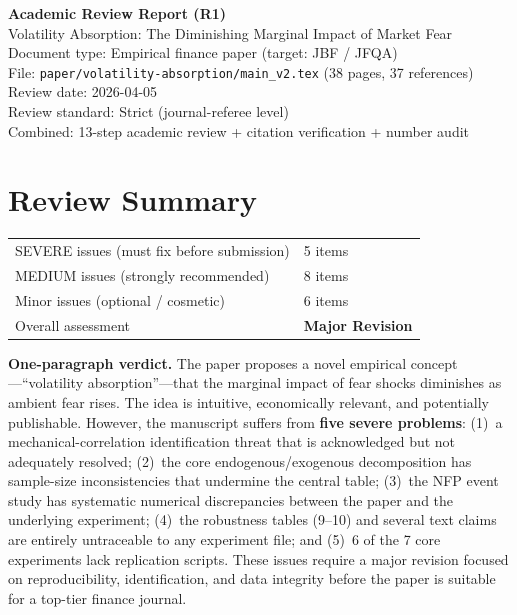 \documentclass[12pt,a4paper]{article}
\begin{document}
\begin{center}
{\Large\bfseries Academic Review Report (R1)}\\[0.5em]
{\large Volatility Absorption: The Diminishing Marginal Impact of Market Fear}\\[0.5em]
{\normalsize Document type: Empirical finance paper (target: JBF / JFQA)}\\
{\normalsize File: \texttt{paper/volatility-absorption/main\_v2.tex} (38 pages, 37 references)}\\
{\normalsize Review date: 2026-04-05}\\
{\normalsize Review standard: Strict (journal-referee level)}\\
{\normalsize Combined: 13-step academic review + citation verification + number audit}
\end{center}

\bigskip

\section*{Review Summary}

\begin{tabular}{ll}
\textcolor{errorred}{SEVERE issues (must fix before submission)} & 5 items \\
\textcolor{warncolor}{MEDIUM issues (strongly recommended)} & 8 items \\
Minor issues (optional / cosmetic) & 6 items \\
Overall assessment & \textbf{Major Revision} \\
\end{tabular}

\bigskip

\noindent\textbf{One-paragraph verdict.}
The paper proposes a novel empirical concept---``volatility absorption''---that the marginal impact of fear shocks diminishes as ambient fear rises.  The idea is intuitive, economically relevant, and potentially publishable.  However, the manuscript suffers from \textbf{five severe problems}: (1)~a mechanical-correlation identification threat that is acknowledged but not adequately resolved; (2)~the core endogenous/exogenous decomposition has sample-size inconsistencies that undermine the central table; (3)~the NFP event study has systematic numerical discrepancies between the paper and the underlying experiment; (4)~the robustness tables (9--10) and several text claims are entirely untraceable to any experiment file; and (5)~6 of the 7 core experiments lack replication scripts.  These issues require a major revision focused on reproducibility, identification, and data integrity before the paper is suitable for a top-tier finance journal.
\end{document}
